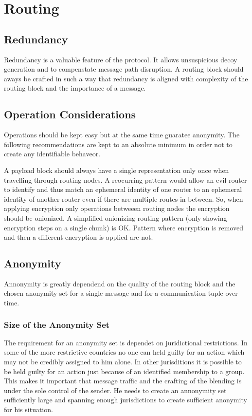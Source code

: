 \section{Routing}

\subsection{Redundancy}
Redundancy is a valuable feature of the protocol. It allows unsuspicious decoy generation and to compenstate message path disruption. A routing block should aways be crafted in such a way that redundancy is aligned with complexity of the routing block and the importance of a message.

\subsection{Operation Considerations}
Operations should be kept easy but at the same time guaratee anonymity. The following recommendations are kept to an absolute  minimum in order not to create any identifiable behaveor.

A payload block should always have a single representation only once when travelling through routing nodes. A reocurring pattern would allow an evil router to identify and thus match an ephemeral identity of one router to an ephemeral identity of another router even if there are multiple routes in between. So, when applying encryption only operations betweeen  routing nodes the encryption should be onionized. A simplified onionizing routing pattern (only showing encryption steps on a single chunk) is OK. Pattern where encryption is removed and then a different encryption is applied are not.

\subsection{Anonymity}
Annonymity is greatly dependend on the quality of the routing block and the chosen anonymity set for a single message and for a communication tuple over time. 

\subsubsection{Size of the Anonymity Set}
The requirement for an anonymity set is dependet on juridictional restrictions. In some of the more restrictive countries no one can held guilty for an action which may not be credibly assigned to him alone. In other jurisditions it is possible to be held guilty for an action just because of an identified membership to a group. This makes it important that message traffic and the crafting of the blending is under the sole control of the sender. He needs to create an annonymity set sufficiently large and spanning enough jurisdictions to create sufficient anonymity for his situation.

